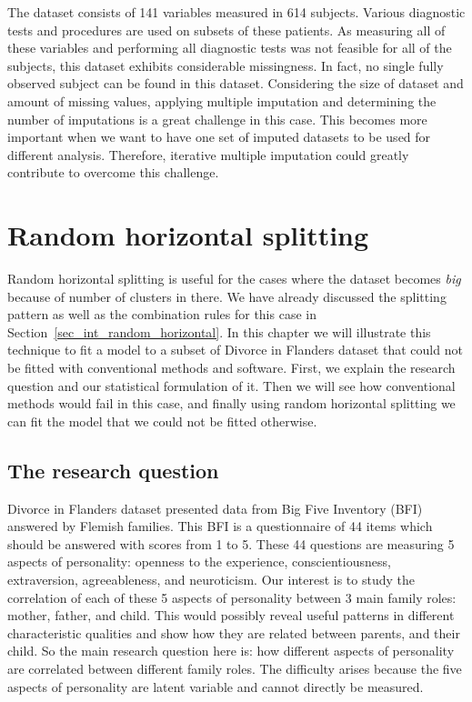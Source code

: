 \documentclass[11pt,a5paper,twoside]{book}
\begin{document}
The dataset consists of 141 variables measured in 614 subjects. Various diagnostic tests and procedures are used on subsets of these patients. As measuring all of these variables and performing all diagnostic tests was not feasible for all of the subjects, this dataset exhibits considerable missingness. In fact, no single fully observed subject can be found in this dataset. Considering the size of dataset and amount of missing values, applying multiple imputation and determining the number of imputations is a great challenge in this case. This becomes more important when we want to have one set of imputed datasets to be used for different analysis. Therefore, iterative multiple imputation could greatly contribute to overcome this challenge.





\chapter{Random horizontal splitting}

Random horizontal splitting is useful for the cases where the dataset becomes \emph{big} because of number of clusters in there. We have already discussed the splitting pattern as well as the combination rules for this case in Section~\ref{sec_int_random_horizontal}. In this chapter we will illustrate this technique to fit a model to a subset of Divorce in Flanders dataset that could not be fitted with conventional methods and software. First, we explain the research question and our statistical formulation of it. Then we will see how conventional methods would fail in this case, and finally using random horizontal splitting we can fit the model that we could not be fitted otherwise.

\section{The research question}

Divorce in Flanders dataset presented data from Big Five Inventory (BFI) answered by Flemish families. This BFI is a questionnaire of 44 items which should be answered with scores from 1 to 5. These 44 questions are measuring 5 aspects of personality: openness to the experience, conscientiousness, extraversion, agreeableness, and neuroticism.  Our interest is to study the correlation of each of these 5 aspects of personality between 3 main family roles: mother, father, and child. This would possibly reveal useful patterns in different characteristic qualities and show how they are related between parents, and their child. So the main research question here is: how different aspects of personality are correlated between different family roles. The difficulty arises because the five aspects of personality are latent variable and cannot directly be measured.
\end{document}

